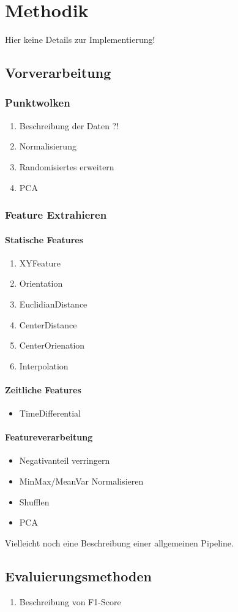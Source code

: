 \chapter{Methodik}
Hier keine Details zur Implementierung!
\section{Vorverarbeitung}
\subsection{Punktwolken}
\begin{enumerate}
  \item Beschreibung der Daten ?!
  \item Normalisierung
  \item Randomisiertes erweitern
  \item PCA
\end{enumerate}

\subsection{Feature Extrahieren}
\subsubsection{Statische Features}
\begin{enumerate}
  \item XYFeature
  \item Orientation
  \item EuclidianDistance
  \item CenterDistance
  \item CenterOrienation
  \item Interpolation
\end{enumerate}

\subsubsection{Zeitliche Features}
\begin{itemize}
\item TimeDifferential
\end{itemize}
\subsubsection{Featureverarbeitung}
\begin{itemize}
  \item Negativanteil verringern
  \item MinMax/MeanVar Normalisieren
  \item Shufflen
  \item PCA
\end{itemize}

Vielleicht noch eine Beschreibung einer allgemeinen Pipeline.
\section{Evaluierungsmethoden}
\begin{enumerate}
  \item Beschreibung von F1-Score
\end{enumerate}
